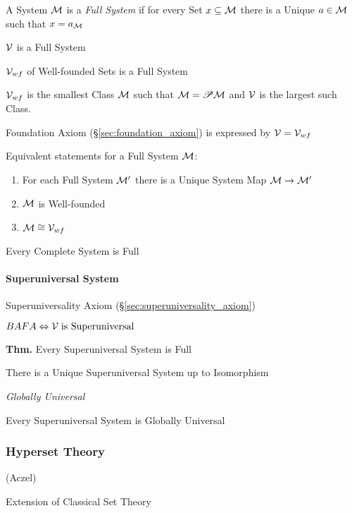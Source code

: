 A System $\mathcal{M}$ is a \emph{Full System} if for every Set $x
\subseteq \mathcal{M}$ there is a Unique $a \in \mathcal{M}$ such that $x
= a_\mathcal{M}$

$\mathcal{V}$ is a Full System

$\mathcal{V}_{wf}$ of Well-founded Sets is a Full System

$\mathcal{V}_{wf}$ is the smallest Class $\mathcal{M}$ such that
$\mathcal{M} = \mathscr{P}\mathcal{M}$ and $\mathcal{V}$ is the largest such Class.

Foundation Axiom (\S\ref{sec:foundation_axiom}) is expressed by
$\mathcal{V} = \mathcal{V}_{wf}$

Equivalent statements for a Full System $\mathcal{M}$:
\begin{enumerate}
  \item For each Full System $\mathcal{M}'$ there is a Unique System Map
    $\mathcal{M} \to \mathcal{M}'$
  \item $\mathcal{M}$ is Well-founded
  \item $\mathcal{M} \cong \mathcal{V}_{wf}$
\end{enumerate}

Every Complete System is Full



\paragraph{Superuniversal System}\label{sec:superuniversal_system}
\hfill

Superuniversality Axiom (\S\ref{sec:superuniversality_axiom})

$BAFA \Leftrightarrow \mathcal{V} \;\text{is Superuniversal}$

\textbf{Thm.} Every Superuniversal System is Full

There is a Unique Superuniversal System up to Isomorphism

\emph{Globally Universal}

Every Superuniversal System is Globally Universal



\subsubsection{Hyperset Theory}\label{sec:hyperset_theory}

(Aczel)

Extension of Classical Set Theory





